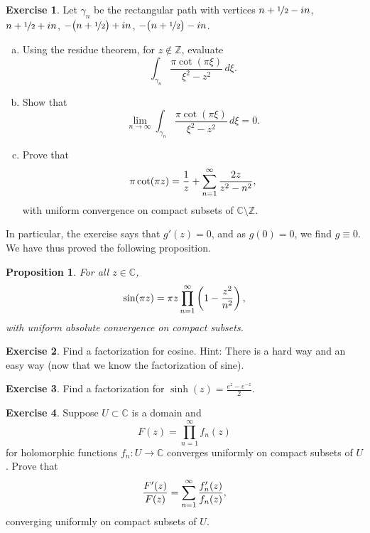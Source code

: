 \documentclass[12pt,openany]{book}
\newcommand{\avoidbreak}{\postdisplaypenalty=100}
\newcommand{\C}{{\mathbb{C}}}
\newcommand{\Z}{{\mathbb{Z}}}
\theoremstyle{plain}
\newtheorem{prop}[thm]{Proposition}
\theoremstyle{remark}
\theoremstyle{definition}
\newenvironment{exbox}{%
    \def\FrameCommand{\vrule width 1pt \relax\hspace{10pt}}%
    \MakeFramed{\advance\hsize-\width\FrameRestore}%
}{%
    \endMakeFramed
}
\newenvironment{exparts}{%
    \leavevmode\begin{enumerate}[a),noitemsep,topsep=0pt,parsep=0pt,partopsep=0pt]
}{%
    \end{enumerate}
}
\theoremstyle{exercise}
\newtheorem{exercise}{Exercise}[section]
\theoremstyle{example}
\begin{document}
\begin{exbox}
\begin{exercise}
Let $\gamma_n$ be the rectangular path with vertices
$n+\nicefrac{1}{2} - in$, 
$n+\nicefrac{1}{2} + in$, 
$-\bigl(n+\nicefrac{1}{2}\bigr) + in$, 
$-\bigl(n+\nicefrac{1}{2}\bigr) - in$.
\begin{exparts}
\item
Using the residue theorem, for $z \notin \Z$, evaluate
\begin{equation*}
\int_{\gamma_n}\frac{\pi \cot (\pi \xi)}{\xi^2-z^2} \, d\xi .
\end{equation*}
\item
Show that
\begin{equation*}
\lim_{n\to \infty}
\int_{\gamma_n}\frac{\pi \cot (\pi \xi)}{\xi^2-z^2} \, d\xi = 0 .
\end{equation*}
\item
Prove that
\begin{equation*}
\pi \cot (\pi z) =
\frac{1}{z}
+
\sum_{n=1}^\infty 
\frac{2z}{z^2-n^2} ,
\avoidbreak
\end{equation*}
with uniform convergence on compact subsets of $\C \setminus \Z$.
\end{exparts}
\end{exercise}
\end{exbox}

In particular, the exercise says that $g'(z)=0$, and as $g(0)=0$, we find $g \equiv 0$.
We have thus proved the following proposition.

\begin{prop}
For all $z \in \C$,
\begin{equation*}
\sin(\pi z) =
\pi z \prod_{n=1}^\infty 
\left(1-\frac{z^2}{n^2}\right) ,
\avoidbreak
\end{equation*}
with uniform absolute convergence on compact subsets.
\end{prop}


\begin{exbox}
\begin{exercise}
Find a factorization for cosine.  Hint: There is a hard way and an
easy way (now that we know the factorization of sine).
\end{exercise}

\begin{exercise}
Find a factorization for $\sinh(z) = \frac{e^z-e^{-z}}{2}$.
\end{exercise}

\begin{exercise}
Suppose $U \subset \C$ is a domain and
\begin{equation*}
F(z) = \prod_{n=1}^\infty f_n(z)
\end{equation*}
for holomorphic functions $f_n \colon U \to \C$ converges uniformly 
on compact subsets of $U$.  Prove that
\begin{equation*}
\frac{F'(z)}{F(z)} = \sum_{n=1}^\infty \frac{f_n'(z)}{f_n(z)} ,
\avoidbreak
\end{equation*}
converging uniformly on compact subsets of $U$.
\end{exercise}
\end{exbox}
\end{document}

